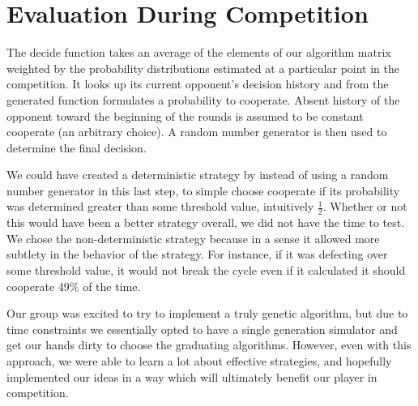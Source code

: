 \documentclass[11pt]{article}
\begin{document}
\section{Evaluation During Competition}

The decide function takes an average of the elements of our algorithm matrix weighted by the probability distributions estimated at a particular point in the competition. It looks up its current opponent's decision history and from the generated function formulates a probability to cooperate. Absent history of the opponent toward the beginning of the rounds is assumed to be constant cooperate (an arbitrary choice). A random number generator is then used to determine the final decision.

We could have created a deterministic strategy by instead of using a random number generator in this last step, to simple choose cooperate if its probability was determined greater than some threshold value, intuitively $\frac{1}{2}$. Whether or not this would have been a better strategy overall, we did not have the time to test. We chose the non-deterministic strategy because in a sense it allowed more subtlety in the behavior of the strategy. For instance, if it was defecting over some threshold value, it would not break the cycle even if it calculated it should cooperate 49\% of the time. 

Our group was excited to try to implement a truly genetic algorithm, but due to time constraints we essentially opted to have a single generation simulator and get our hands dirty to choose the graduating algorithms. However, even with this approach, we were able to learn a lot about effective strategies, and hopefully implemented our ideas in a way which will ultimately benefit our player in competition. 
\end{document}
